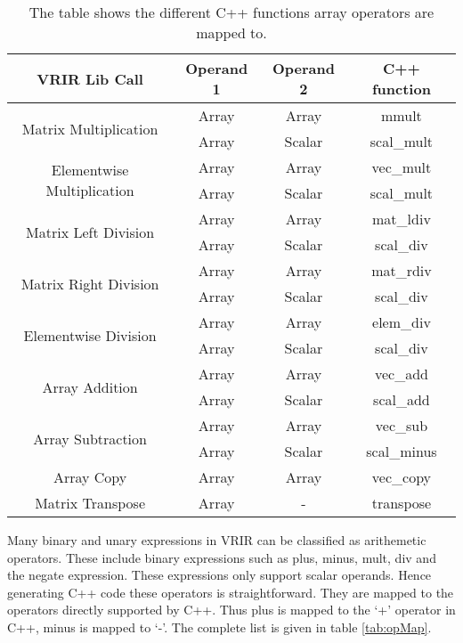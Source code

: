 					\begin{table}[htbp]
					\centering
					\begin{tabular}{|c|c|c|c|}
					\hline
					VRIR Lib Call                               & Operand 1 & Operand 2 & C++ function \\ \hline
					\multirow{2}{*}{Matrix Multiplication}      & Array     & Array     & mmult        \\ \cline{2-4} 
					& Array     & Scalar    & scal\_mult   \\ \hline
					\multirow{2}{*}{Elementwise Multiplication} & Array     & Array     & vec\_mult    \\ \cline{2-4} 
					& Array     & Scalar    & scal\_mult   \\ \hline
					\multirow{2}{*}{Matrix Left Division}       & Array     & Array     & mat\_ldiv    \\ \cline{2-4} 
					& Array     & Scalar    & scal\_div    \\ \hline
					\multirow{2}{*}{Matrix Right Division}      & Array     & Array     & mat\_rdiv    \\ \cline{2-4} 
					& Array     & Scalar    & scal\_div    \\ \hline
					\multirow{2}{*}{Elementwise Division}       & Array     & Array     & elem\_div    \\ \cline{2-4} 
					& Array     & Scalar    & scal\_div    \\ \hline
					\multirow{2}{*}{Array Addition}             & Array     & Array     & vec\_add     \\ \cline{2-4} 
					& Array     & Scalar    & scal\_add    \\ \hline
					\multirow{2}{*}{Array Subtraction}          & Array     & Array     & vec\_sub     \\ \cline{2-4} 
					& Array     & Scalar    & scal\_minus  \\ \hline
					Array Copy                                  & Array     & Array     & vec\_copy    \\ \hline
					Matrix Transpose                            & Array     & -         & transpose    \\ \hline
					\end{tabular}
					\caption[List of operations on Arrays]{The table shows the different C++ functions array operators are mapped to. }
					\label{tab:arrayOpMap}
					\end{table}
Many binary and unary expressions in VRIR can be classified as arithemetic operators. These include binary expressions such as  plus, minus, mult, div and the negate expression. These expressions  only support scalar operands. Hence generating C++ code these operators is straightforward. They are mapped to the operators directly supported by C++. Thus plus is mapped to the `+' operator in C++, minus is mapped to `-'. The complete list is given in table \ref{tab:opMap}. \\

